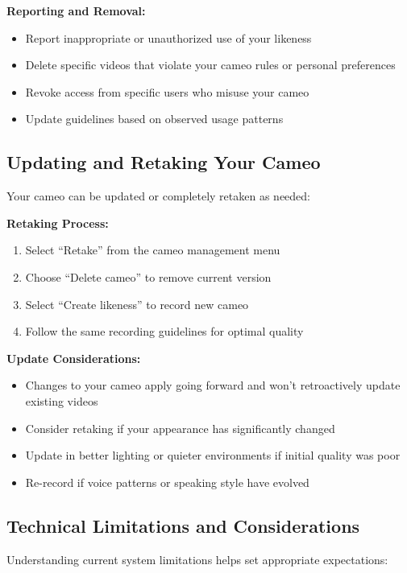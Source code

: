 \textbf{Reporting and Removal:}
\begin{itemize}
\item Report inappropriate or unauthorized use of your likeness
\item Delete specific videos that violate your cameo rules or personal preferences
\item Revoke access from specific users who misuse your cameo
\item Update guidelines based on observed usage patterns
\end{itemize}

\subsection{Updating and Retaking Your Cameo}

Your cameo can be updated or completely retaken as needed:

\textbf{Retaking Process:}
\begin{enumerate}
\item Select ``Retake'' from the cameo management menu
\item Choose ``Delete cameo'' to remove current version
\item Select ``Create likeness'' to record new cameo
\item Follow the same recording guidelines for optimal quality
\end{enumerate}

\textbf{Update Considerations:}
\begin{itemize}
\item Changes to your cameo apply going forward and won't retroactively update existing videos
\item Consider retaking if your appearance has significantly changed
\item Update in better lighting or quieter environments if initial quality was poor
\item Re-record if voice patterns or speaking style have evolved
\end{itemize}

\subsection{Technical Limitations and Considerations}

Understanding current system limitations helps set appropriate expectations:

